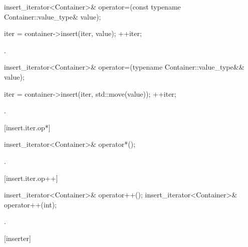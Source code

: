 %
\begin{itemdecl}
insert_iterator<Container>&
  operator=(const typename Container::value_type& value);
\end{itemdecl}

\begin{itemdescr}
\pnum
\effects
\begin{codeblock}
iter = container->insert(iter, value);
++iter;
\end{codeblock}

\pnum
\returns
{}.
\end{itemdescr}

%
\begin{itemdecl}
insert_iterator<Container>&
  operator=(typename Container::value_type&& value);
\end{itemdecl}

\begin{itemdescr}
\pnum
\effects
\begin{codeblock}
iter = container->insert(iter, std::move(value));
++iter;
\end{codeblock}

\pnum
\returns
{}.
\end{itemdescr}

[insert.iter.op*]{}

%
\begin{itemdecl}
insert_iterator<Container>& operator*();
\end{itemdecl}

\begin{itemdescr}
\pnum
\returns
{}.
\end{itemdescr}

[insert.iter.op++]{}

%
\begin{itemdecl}
insert_iterator<Container>& operator++();
insert_iterator<Container>& operator++(int);
\end{itemdecl}

\begin{itemdescr}
\pnum
\returns
{}.
\end{itemdescr}

[inserter]{}

